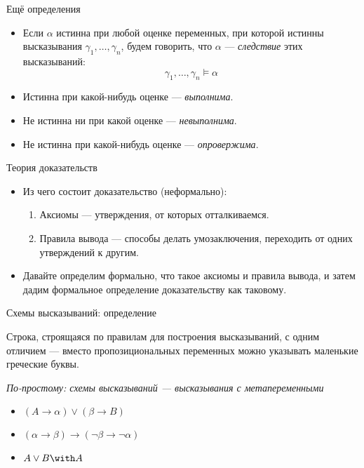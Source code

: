 \documentclass[aspectratio=169]{beamer}
\begin{document}
\begin{frame}{Ещё определения}
\begin{itemize}
\item Если $\alpha$ истинна при любой оценке переменных, при которой истинны 
высказывания $\gamma_1, \dots, \gamma_n$, будем говорить, что $\alpha$ --- \emph{следствие} этих высказываний:
$$\gamma_1, \dots, \gamma_n \models \alpha$$\pause
\item Истинна при какой-нибудь оценке --- \emph{выполнима}.\pause
\item Не истинна ни при какой оценке --- \emph{невыполнима}.\pause
\item Не истинна при какой-нибудь оценке --- \emph{опровержима}.
\end{itemize}
\end{frame}

\begin{frame}{Теория доказательств}

\begin{itemize}
\item Из чего состоит доказательство (неформально):
\begin{enumerate}
\item Аксиомы --- утверждения, от которых отталкиваемся.
\item Правила вывода --- способы делать умозаключения, переходить от одних утверждений к другим.
\end{enumerate}\pause

\item Давайте определим формально, что такое аксиомы и правила вывода, и затем дадим формальное 
определение доказательству как таковому.
\end{itemize}

\end{frame}

\begin{frame}{Схемы высказываний: определение}

\begin{defrus} Строка, строящаяся по правилам для построения высказываний, с одним отличием ---
вместо пропозициональных переменных можно указывать маленькие греческие буквы.\end{defrus}\pause

\emph{По-простому: схемы высказываний --- высказывания с метапеременными}\pause

\begin{exmprus}
\begin{itemize}
\item $(A \rightarrow \alpha) \vee (\beta \rightarrow B)$\pause
\item $(\alpha\rightarrow\beta)\rightarrow(\neg\beta\rightarrow\neg\alpha)$\pause
\item $A\vee B \with A$
\end{itemize}
\end{exmprus}

\end{frame}
\end{document}
